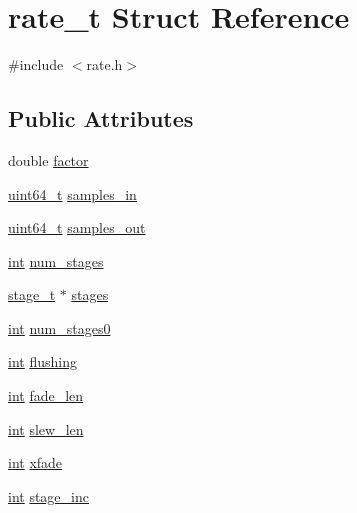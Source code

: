 \hypertarget{structrate__t}{}\section{rate\+\_\+t Struct Reference}
\label{structrate__t}


{\ttfamily \#include $<$rate.\+h$>$}

\subsection*{Public Attributes}
\begin{DoxyCompactItemize}
\item 
double \hyperlink{structrate__t_ad6971ee5baa6fb79dc1778617e62996c}{factor}
\item 
\hyperlink{lib-src_2ffmpeg_2win32_2stdint_8h_aec6fcb673ff035718c238c8c9d544c47}{uint64\+\_\+t} \hyperlink{structrate__t_ab30c53f0ff75617fe5a4a736e15788c0}{samples\+\_\+in}
\item 
\hyperlink{lib-src_2ffmpeg_2win32_2stdint_8h_aec6fcb673ff035718c238c8c9d544c47}{uint64\+\_\+t} \hyperlink{structrate__t_ae545c3de9f6a7b180de1582e2994b84a}{samples\+\_\+out}
\item 
\hyperlink{xmltok_8h_a5a0d4a5641ce434f1d23533f2b2e6653}{int} \hyperlink{structrate__t_abb2523f280abe614cfde5e2fcfc151b7}{num\+\_\+stages}
\item 
\hyperlink{structstage__t}{stage\+\_\+t} $\ast$ \hyperlink{structrate__t_a4821b0ff0397aa4b7e0de1676f9a4928}{stages}
\item 
\hyperlink{xmltok_8h_a5a0d4a5641ce434f1d23533f2b2e6653}{int} \hyperlink{structrate__t_ac3f570df4ab01d424ef1e3bc4611f081}{num\+\_\+stages0}
\item 
\hyperlink{xmltok_8h_a5a0d4a5641ce434f1d23533f2b2e6653}{int} \hyperlink{structrate__t_a34c9ea2ba61108bbec6a71b68e5f592a}{flushing}
\item 
\hyperlink{xmltok_8h_a5a0d4a5641ce434f1d23533f2b2e6653}{int} \hyperlink{structrate__t_a2ec0e02f987765366f4817e431c8c468}{fade\+\_\+len}
\item 
\hyperlink{xmltok_8h_a5a0d4a5641ce434f1d23533f2b2e6653}{int} \hyperlink{structrate__t_ae1380b897bb6a2d096cfbee5b064121c}{slew\+\_\+len}
\item 
\hyperlink{xmltok_8h_a5a0d4a5641ce434f1d23533f2b2e6653}{int} \hyperlink{structrate__t_a50cb06c68c3370792173457df6041104}{xfade}
\item 
\hyperlink{xmltok_8h_a5a0d4a5641ce434f1d23533f2b2e6653}{int} \hyperlink{structrate__t_acb8bf64869f4122a7ccdd565044aac7d}{stage\+\_\+inc}

\end{DoxyCompactItemize}
